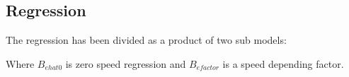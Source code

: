 \subsection{Regression}
The regression has been divided as a product of two sub models:

Where $B_{ehat0}$ is zero speed regression and $B_{efactor}$ is a speed depending factor.




